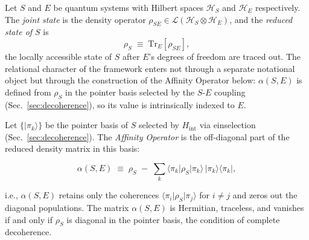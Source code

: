 \begin{definition}
\label{def:rho}
Let $S$ and $E$ be quantum systems with Hilbert spaces
$\mathcal{H}_S$ and $\mathcal{H}_E$ respectively.
The \emph{joint state} is the density operator
$\rho_{SE} \in \mathcal{L}(\mathcal{H}_S \otimes \mathcal{H}_E)$,
and the \emph{reduced state of $S$} is
\begin{equation}
\label{eq:rho-def}
  \rho_S \;\equiv\; \mathrm{Tr}_E[\rho_{SE}],
\end{equation}
the locally accessible state of $S$ after $E$'s degrees of freedom
are traced out.
The relational character of the framework enters not through a
separate notational object but through the construction of the
Affinity Operator below: $\alpha(S,E)$ is defined from $\rho_S$ in
the pointer basis selected by the $S$-$E$ coupling
(Sec.~\ref{sec:decoherence}), so its value is intrinsically indexed
to $E$.
\end{definition}

\begin{definition}
\label{def:alpha-tensor}
Let $\{\vert \pi_k \rangle\}$ be the pointer basis of $S$
selected by $H_{\mathrm{int}}$ via einselection
(Sec.~\ref{sec:decoherence}).
The \emph{Affinity Operator} is the off-diagonal part of the
reduced density matrix in this basis:

\begin{equation}
\label{eq:alpha-tensor}
\alpha(S,E) \;\equiv\; \rho_S \;-\; \sum_k
  \langle \pi_k \vert \rho_S \vert \pi_k \rangle\,
  \vert \pi_k \rangle\langle \pi_k \vert,
\end{equation}

\noindent
i.e., $\alpha(S,E)$ retains only the coherences
$\langle \pi_i \vert \rho_S \vert \pi_j \rangle$ for $i \neq j$
and zeros out the diagonal populations.
The matrix $\alpha(S,E)$ is Hermitian, traceless, and vanishes
if and only if $\rho_S$ is diagonal in the pointer basis, the condition of complete decoherence.
\end{definition}

